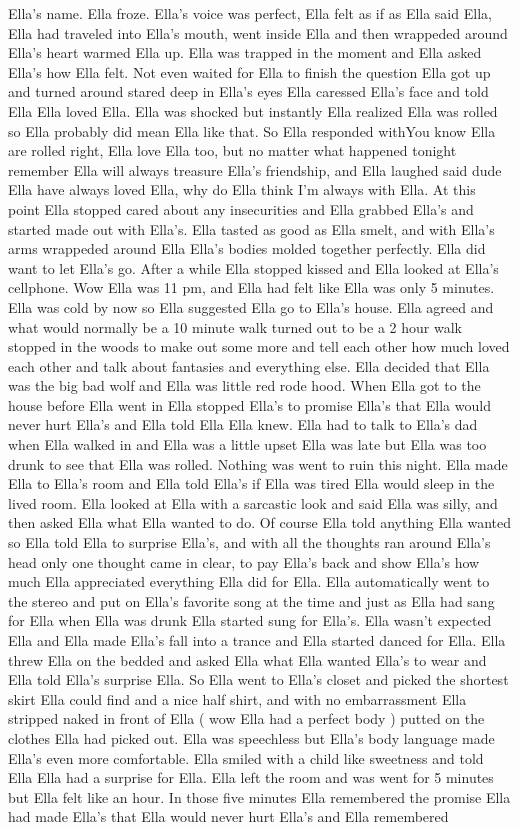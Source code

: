 \documentclass[12pt]{book}
\begin{document}
Ella's name. Ella froze. Ella's voice was perfect, Ella felt as if as Ella said Ella, Ella had traveled into Ella's mouth, went inside Ella and then wrappeded around Ella's heart warmed Ella up. Ella was trapped in the moment and Ella asked Ella's how Ella felt. Not even waited for Ella to finish the question Ella got up and turned around stared deep in Ella's eyes Ella caressed Ella's face and told Ella Ella loved Ella. Ella was shocked but instantly Ella realized Ella was rolled so Ella probably did mean Ella like that. So Ella responded withYou know Ella are rolled right, Ella love Ella too, but no matter what happened tonight remember Ella will always treasure Ella's friendship, and Ella laughed said dude Ella have always loved Ella, why do Ella think I'm always with Ella. At this point Ella stopped cared about any insecurities and Ella grabbed Ella's and started made out with Ella's. Ella tasted as good as Ella smelt, and with Ella's arms wrappeded around Ella Ella's bodies molded together perfectly. Ella did want to let Ella's go. After a while Ella stopped kissed and Ella looked at Ella's cellphone. Wow Ella was 11 pm, and Ella had felt like Ella was only 5 minutes. Ella was cold by now so Ella suggested Ella go to Ella's house. Ella agreed and what would normally be a 10 minute walk turned out to be a 2 hour walk stopped in the woods to make out some more and tell each other how much loved each other and talk about fantasies and everything else. Ella decided that Ella was the big bad wolf and Ella was little red rode hood. When Ella got to the house before Ella went in Ella stopped Ella's to promise Ella's that Ella would never hurt Ella's and Ella told Ella Ella knew. Ella had to talk to Ella's dad when Ella walked in and Ella was a little upset Ella was late but Ella was too drunk to see that Ella was rolled. Nothing was went to ruin this night. Ella made Ella to Ella's room and Ella told Ella's if Ella was tired Ella would sleep in the lived room. Ella looked at Ella with a sarcastic look and said Ella was silly, and then asked Ella what Ella wanted to do. Of course Ella told anything Ella wanted so Ella told Ella to surprise Ella's, and with all the thoughts ran around Ella's head only one thought came in clear, to pay Ella's back and show Ella's how much Ella appreciated everything Ella did for Ella. Ella automatically went to the stereo and put on Ella's favorite song at the time and just as Ella had sang for Ella when Ella was drunk Ella started sung for Ella's. Ella wasn't expected Ella and Ella made Ella's fall into a trance and Ella started danced for Ella. Ella threw Ella on the bedded and asked Ella what Ella wanted Ella's to wear and Ella told Ella's surprise Ella. So Ella went to Ella's closet and picked the shortest skirt Ella could find and a nice half shirt, and with no embarrassment Ella stripped naked in front of Ella ( wow Ella had a perfect body ) putted on the clothes Ella had picked out. Ella was speechless but Ella's body language made Ella's even more comfortable. Ella smiled with a child like sweetness and told Ella Ella had a surprise for Ella. Ella left the room and was went for 5 minutes but Ella felt like an hour. In those five minutes Ella remembered the promise Ella had made Ella's that Ella would never hurt Ella's and Ella remembered 
\end{document}
